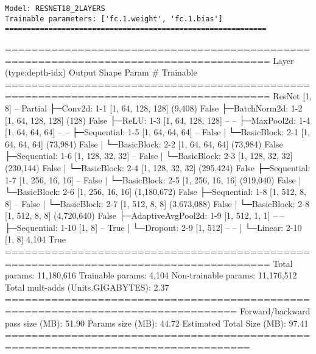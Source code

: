 \newpage
\EN
\begin{verbatim}
Model: RESNET18_2LAYERS
Trainable parameters: ['fc.1.weight', 'fc.1.bias']
============================================================
\end{verbatim}

\begin{minipage}{\linewidth} %
\begin{CodeBlock}
======================================================================================
Layer (type:depth-idx)            Output Shape              Param #     Trainable
======================================================================================
ResNet                            [1, 8]             --                 Partial
├─Conv2d: 1-1                     [1, 64, 128, 128]         (9,408)     False
├─BatchNorm2d: 1-2                [1, 64, 128, 128]         (128)       False
├─ReLU: 1-3                       [1, 64, 128, 128]         --          --
├─MaxPool2d: 1-4                  [1, 64, 64, 64]           --          --
├─Sequential: 1-5                 [1, 64, 64, 64]           --          False
|    └─BasicBlock: 2-1            [1, 64, 64, 64]           (73,984)    False
|    └─BasicBlock: 2-2            [1, 64, 64, 64]           (73,984)    False
├─Sequential: 1-6                 [1, 128, 32, 32]          --          False
|    └─BasicBlock: 2-3            [1, 128, 32, 32]          (230,144)   False
|    └─BasicBlock: 2-4            [1, 128, 32, 32]          (295,424)   False
├─Sequential: 1-7                 [1, 256, 16, 16]          --          False
|    └─BasicBlock: 2-5            [1, 256, 16, 16]          (919,040)   False
|    └─BasicBlock: 2-6            [1, 256, 16, 16]          (1,180,672) False
├─Sequential: 1-8                 [1, 512, 8, 8]            --          False
|    └─BasicBlock: 2-7            [1, 512, 8, 8]            (3,673,088) False
|    └─BasicBlock: 2-8            [1, 512, 8, 8]            (4,720,640) False
├─AdaptiveAvgPool2d: 1-9          [1, 512, 1, 1]            --          --
├─Sequential: 1-10                [1, 8]                    --          True
|    └─Dropout: 2-9               [1, 512]                  --           --
|    └─Linear: 2-10               [1, 8]                    4,104       True
======================================================================================
Total params: 11,180,616
Trainable params: 4,104
Non-trainable params: 11,176,512
Total mult-adds (Units.GIGABYTES): 2.37
=================================================================================
Forward/backward pass size (MB): 51.90
Params size (MB): 44.72
Estimated Total Size (MB): 97.41
===================================================================================
\end{CodeBlock}
\end{minipage}


